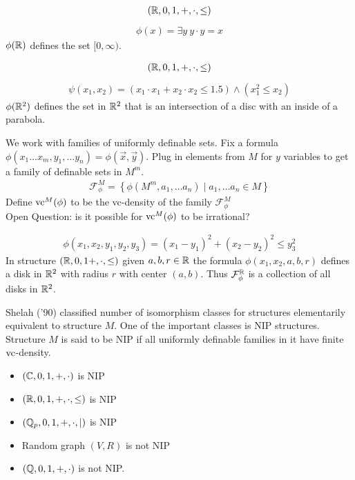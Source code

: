 \documentclass{beamer}
\newcommand{\F}{\mathcal F}
\newcommand{\curly}[1]{\left\{ #1 \right\}}
\begin{document}
\begin{frame}
	\begin{align*}
		(\mathbb{R}, 0, 1, +, \cdot, \leq)
	\end{align*}
	\begin{align*}
		\phi(x) = \exists y \ y \cdot y = x
	\end{align*}
	$\phi(\mathbb{R})$ defines the set $[0, \infty)$.
\end{frame}

\begin{frame}
	\begin{align*}
		(\mathbb{R}, 0, 1, +, \cdot, \leq)
	\end{align*}
	\begin{align*}
		\psi(x_1, x_2) = (x_1 \cdot x_1 + x_2 \cdot x_2 \leq 1.5) \wedge (x_1^2 \leq x_2)
	\end{align*}
	$\phi(\mathbb{R}^2)$ defines the set in $\mathbb{R}^2$ that is an intersection of a disc with an inside of a parabola.
\end{frame}

\begin{frame}
	We work with families of uniformly definable sets.
	Fix a formula $\phi(x_1 \ldots x_m, y_1, \ldots y_n) = \phi(\vec x, \vec y)$.
	Plug in elements from $M$ for $y$ variables to get a family of definable sets in $M^m$.
	\begin{align*}
		\F^M_\phi = \curly{\phi(M^m, a_1, \ldots a_n) \mid a_1, \ldots a_n \in M}
	\end{align*}
	Define $\operatorname{vc}^M(\phi)$ to be the vc-density of the family $\F^M_\phi$ \\
	Open Question: is it possible for $\operatorname{vc}^M(\phi)$ to be irrational?
\end{frame}

\begin{frame}
	\begin{align*}
		\phi(x_1, x_2, y_1, y_2, y_3) = (x_1 - y_1)^2 + (x_2 - y_2)^2 \leq y_3^2
	\end{align*}
	In structure $(\mathbb{R}, 0, 1 +, \cdot, \leq)$ given $a,b,r \in \mathbb{R}$ the formula $\phi(x_1, x_2, a, b, r)$ defines a disk in $\mathbb{R}^2$ with radius $r$ with center $(a,b)$.
	Thus $\F^\R_\phi$ is a collection of all disks in $\mathbb{R}^2$.
\end{frame}

\begin{frame}
	Shelah ('90) classified number of isomorphism classes for structures elementarily equivalent to structure $M$.
	One of the important classes is NIP structures.
	Structure $M$ is said to be NIP if all uniformly definable families in it have finite $\operatorname{vc}$-density.
	\begin{itemize}
		\item $(\mathbb{C}, 0, 1, +, \cdot)$ is NIP
		\item $(\mathbb{R}, 0, 1, +, \cdot, \leq)$ is NIP
		\item $(\mathbb{Q}_p, 0, 1, +, \cdot, \mid)$ is NIP
		\item Random graph $(V, R)$ is not NIP
		\item $(\mathbb{Q}, 0, 1, +, \cdot)$ is not NIP.
	\end{itemize}
\end{frame}
\end{document}

